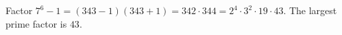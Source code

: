 Factor $7^6-1=(343-1)(343+1)=342\cdot344=2^4\cdot3^2\cdot19\cdot43$. The largest prime factor is $\boxed{43}$.
